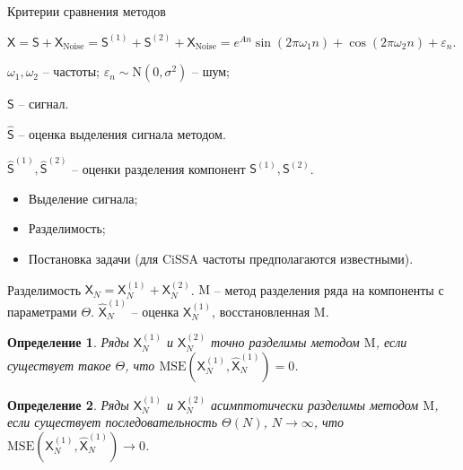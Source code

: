 \documentclass[notheorems, handout]{beamer}
\newtheorem{definition}{Определение}
\newcommand{\TS}{\mathsf{X}}
\begin{document}
\begin{frame}{Критерии сравнения методов}

	{\Large
		\textbf{}

		$\TS = \mathsf{S} + \TS_{\mathrm{Noise}}=
			\mathsf{S}^{(1)} + \mathsf{S}^{(2)} + \TS_{\mathrm{Noise}}=
			e^{A{n}}
			\sin\left({2\pi\omega_1 n}\right) +
			\cos\left({2\pi\omega_2 n}\right) + \varepsilon_n$.

		$\omega_1, \omega_2$ -- частоты;
		$\varepsilon_n \sim \mathrm N(0, \sigma^2)$ -- шум;

		$\mathsf{S}$ -- сигнал.

		$\hat{\mathsf{S}}$ -- оценка выделения сигнала методом.

		$\hat{\mathsf{S}}^{(1)},
			\hat{\mathsf{S}}^{(2)}$ -- оценки разделения компонент $\mathsf{S}^{(1)}, \mathsf{S}^{(2)}$.
	}


	\bigskip

	\textbf{}
	\begin{itemize}
		\item Выделение сигнала;
		\item Разделимость;
		\item Постановка задачи (для CiSSA частоты предполагаются известными).
	\end{itemize}

\end{frame}


\begin{frame}{Разделимость}
	\( \TS_N = \TS^{(1)}_N + \TS^{(2)}_N \).
	$\mathrm M$ -- метод разделения ряда на компоненты с параметрами $\Theta$.
	$\hat{\TS}_N^{(1)}$ -- оценка $\TS_N^{(1)}$, восстановленная $\mathrm M$.
	\begin{definition}
		\label{def:exact}
		Ряды \( \TS^{(1)}_N \) и \( \TS^{(2)}_N \) точно разделимы методом $\mathrm M$, если существует такое \( {\Theta} \), что \( \mathrm{MSE}\left(\TS^{(1)}_N, \hat{\TS}^{(1)}_N\right) = 0 \).
	\end{definition}

	\begin{definition}
		\label{def:asymp}
		Ряды \( \TS^{(1)}_N \) и \( \TS^{(2)}_N \) асимптотически разделимы методом $\mathrm M$, если существует последовательность \( {\Theta}(N)\), \( N \rightarrow \infty \), что \( \mathrm{MSE}\left(\TS^{(1)}_N, \hat{\TS}^{(1)}_N\right) \rightarrow 0 \).
	\end{definition}

\end{frame}
\end{document}
